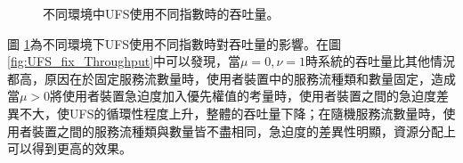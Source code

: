 \begin{figure}[H]
\centering
{}
\caption{\label{fig:UFS_Throughput}不同環境中UFS使用不同指數時的吞吐量。}
\end{figure}
圖 \ref{fig:UFS_Throughput}為不同環境下UFS使用不同指數時對吞吐量的影響。在圖 \ref{fig:UFS_fix_Throughput}中可以發現，當$\mu=0,\nu=1$時系統的吞吐量比其他情況都高，原因在於固定服務流數量時，使用者裝置中的服務流種類和數量固定，造成當$\mu>0$將使用者裝置急迫度加入優先權值的考量時，使用者裝置之間的急迫度差異不大，使UFS的循環性程度上升，整體的吞吐量下降；在隨機服務流數量時，使用者裝置之間的服務流種類與數量皆不盡相同，急迫度的差異性明顯，資源分配上可以得到更高的效果。

